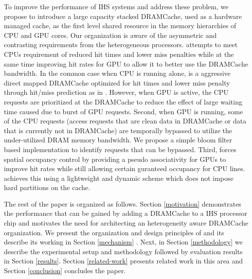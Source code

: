 To improve the performance of IHS systems and address these problem, we propose to introduce a large capacity stacked DRAMCache, used as a hardware managed cache, as the first level shared resource in the memory hierarchies of CPU and GPU cores. Our organization \cachename is aware of the asymmetric and contrasting requirements from the heterogeneous processors. \cachename attempts to meet CPUs requirement of reduced hit times and lower miss penalties while at the same time improving hit rates for GPU to allow it to better use the DRAMCache bandwidth. In the common case when CPU is running alone, \textit{\cachename} is a aggressive direct mapped DRAMCache optimized for hit times and lower miss penalty through hit/miss prediction as in \cite{alloy}. However, when GPU is active, the CPU requests are prioritized at the DRAMCache to reduce the effect of large waiting time caused due to burst of GPU requests. Second, when GPU is running, some of the CPU requests (access requests that are clean data in DRAMCache or data that is currently not in DRAMCache) are temporally bypassed to utilize the under-utilized DRAM memory bandwidth. We propose a simple bloom filter based implementation to identify requests that can be bypassed. Third, \cachename forces spatial occupancy control by providing a pseudo associativity for GPUs to improve hit rates while still allowing certain guranteed occupancy for CPU lines. \cachename achieves this using a lightweight and dynamic scheme which does not impose hard partitions on the cache.


The rest of the paper is organized as follows. Section \ref{motivation} demonstrates the performance that can be gained by adding a DRAMCache to a IHS processor chip and motivates the need for architecting an heterogeneity aware DRAMCache organization. We present the organization and design principles of \cachename and its describe its working in Section \ref{mechanism} . Next, in Section \ref{methodology} we describe the experimental setup and methodology followed by evaluation results in Section \ref{results}. Section \ref{related-work} presents related work in this area and Section \ref{conclusion} concludes the paper.
